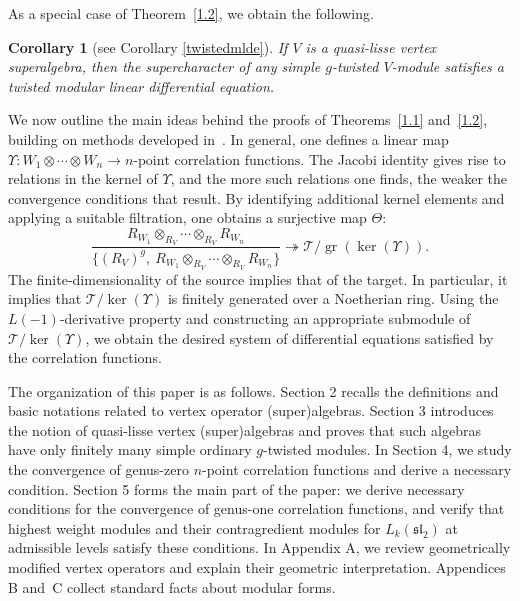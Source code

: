\documentclass[9pt]{amsart}
\newtheorem{corollary}{Corollary}[section]
\newcommand{\T}{\mathcal{T}}
\begin{document}
As a special case of Theorem~\ref{1.2}, we obtain the following.
\begin{corollary}[see Corollary \ref{twistedmlde}]
If \( V \) is a quasi-lisse vertex superalgebra, then the supercharacter of any simple \( g \)-twisted \( V \)-module satisfies a twisted modular linear differential equation.
\end{corollary}




We now outline the main ideas behind the proofs of Theorems~\ref{1.1} and~\ref{1.2}, building on methods developed in~\cite{zhu1996modular, huang2005differential1,huang2005differential,arakawa2018quasi}. In general, one defines a linear map
$\Upsilon : W_1 \otimes \cdots \otimes W_n \longrightarrow \text{$n$-point correlation functions}.$
The Jacobi identity gives rise to relations in the kernel of $\Upsilon$, and the more such relations one finds, the weaker the convergence conditions that result. By identifying additional kernel elements and applying a suitable filtration, one obtains a surjective map $\Theta$:
\[
\frac{R_{W_1} \otimes_{R_V} \cdots \otimes_{R_V} R_{W_n}}{\{(R_V)^g,\ R_{W_1} \otimes_{R_V} \cdots \otimes_{R_V} R_{W_n}\}} \twoheadrightarrow \T / \operatorname{gr}(\ker({\Upsilon})).
\]
The finite-dimensionality of the source implies that of the target. In particular, it implies that $\T/\ker(\Upsilon)$ is finitely generated over a Noetherian ring. Using the $L(-1)$-derivative property and constructing an appropriate submodule of $\T/\ker(\Upsilon)$, we obtain the desired system of differential equations satisfied by the correlation functions.

The organization of this paper is as follows. Section 2 recalls the definitions and basic notations related to vertex operator (super)algebras. Section 3 introduces the notion of quasi-lisse vertex (super)algebras and proves that such algebras have only finitely many simple ordinary $g$-twisted modules. In Section 4, we study the convergence of genus-zero $n$-point correlation functions and derive a necessary condition. Section 5 forms the main part of the paper: we derive necessary conditions for the convergence of genus-one correlation functions, and verify that highest weight modules and their contragredient modules for $L_k(\mathfrak{sl}_2)$ at admissible levels satisfy these conditions. In Appendix A, we review geometrically modified vertex operators and explain their geometric interpretation. Appendices B and~C collect standard facts about modular forms.
\end{document}
